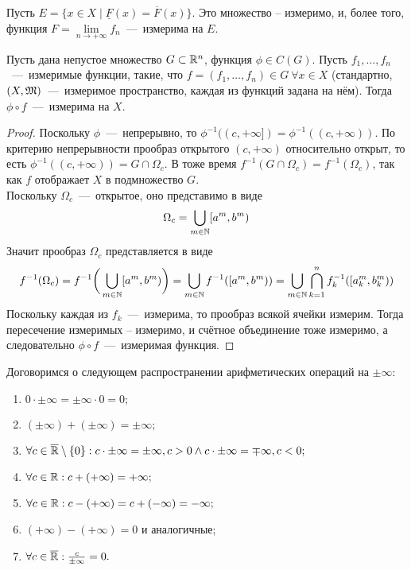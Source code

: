 \begin{corollary}
    Пусть $E = \{x \in X \mid \underline{F}(x) = \overline{F}(x)\}$. Это множество -- измеримо, и, более того, функция $F = \lim\limits_{n \rightarrow +\infty} f_n$~---~измерима на $E$.
\end{corollary}

\begin{theorem}
    Пусть дана непустое множество $G \subset \mathbb{R}^n$, функция $\phi \in C(G)$. Пусть $f_1, \ldots, f_n$~---~измеримые функции, такие, что $f = (f_1, \ldots, f_n) \in G \  \forall x \in X$  (стандартно, $(X, \mathfrak{M})$~---~измеримое пространство, каждая из функций задана на нём). Тогда $\phi \circ f$~---~измерима на $X$.
\end{theorem}
\begin{proof}
    Поскольку $\phi$~---~непрерывно, то $\phi^{-1}((c, +\infty]) = \phi^{-1}((c, +\infty))$. По критерию непрерывности прообраз открытого $(c, +\infty)$ относительно открыт, то есть $\phi^{-1}((c, +\infty)) = G \cap \Omega_c$. В тоже время $f^{-1}(G \cap \Omega_c) = f^{-1}(\Omega_c)$, так как $f$ отображает $X$ в подмножество $G$. \\ Поскольку $\Omega_c$~---~открытое, оно представимо в виде \[\Omega_c = \bigcup\limits_{m \in \mathbb{N}} [a^m, b^m)\]
    Значит прообраз $\Omega_c$ представляется в виде \[f^{-1}(\Omega_c) = f^{-1}\biggr(\bigcup\limits_{m \in \mathbb{N}} [a^m, b^m)\biggr) = \bigcup\limits_{m \in \mathbb{N}} f^{-1}([a^m, b^m)) = \bigcup\limits_{m \in \mathbb{N}} \bigcap\limits_{k = 1}^n f_k^{-1}([a^m_k, b^m_k))\] Поскольку каждая из $f_k$~---~измерима, то прообраз всякой ячейки измерим. Тогда пересечение измеримых -- измеримо, и счётное объединение тоже измеримо, а следовательно $\phi \circ f$~---~измеримая функция.
\end{proof}

\begin{remark}
    Договоримся о следующем распространении арифметических операций на $\pm\infty$:
    \begin{enumerate}
        \item $0 \cdot \pm\infty = \pm\infty \cdot 0 = 0;$
        \item $(\pm\infty) + (\pm\infty) = \pm\infty;$
        \item $\forall c \in \overline{\mathbb{R}} \setminus \{0\}: c \cdot \pm\infty = \pm\infty, c > 0 \wedge c \cdot \pm\infty = \mp\infty, c < 0;$
        \item $\forall c \in \mathbb{R}: c + (+\infty) = +\infty;$
        \item $\forall c \in \mathbb{R}: c - (+\infty) = c + (-\infty) = -\infty;$
        \item $(+\infty) - (+\infty) = 0$ и аналогичные;
        \item $\forall c \in \overline{\mathbb{R}}: \frac{c}{\pm\infty} = 0.$
    \end{enumerate}
\end{remark}

